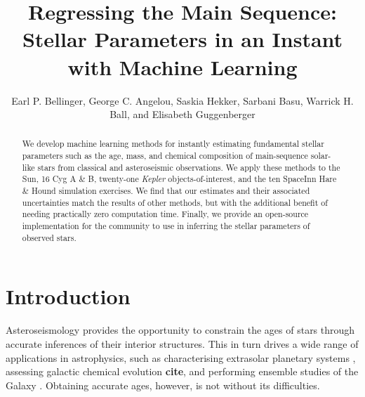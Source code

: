 \documentclass[manuscript]{aastex}
\begin{document}
\title{Regressing the Main Sequence:\\Stellar Parameters in an Instant with Machine Learning}

\author{Earl P. Bellinger, George C. Angelou, Saskia Hekker, Sarbani Basu, Warrick H. Ball, and Elisabeth Guggenberger}


\begin{abstract}
We develop machine learning methods for instantly estimating fundamental stellar parameters such as the age, mass, and chemical composition of main-sequence solar-like stars from classical and asteroseismic observations. We apply these methods to the Sun, 16 Cyg A \& B, twenty-one \emph{Kepler} objects-of-interest, and the ten SpaceInn Hare \& Hound simulation exercises. We find that our estimates and their associated uncertainties match the results of other methods, but with the additional benefit of needing practically zero computation time. Finally, we provide an open-source implementation for the community to use in inferring the stellar parameters of observed stars. 
\end{abstract}




\section{Introduction}

Asteroseismology provides the opportunity to constrain the ages of stars through accurate inferences of their interior structures. This in turn drives a wide range of applications in astrophysics, such as characterising extrasolar planetary systems \citep{2015ApJ...799..170C,2015MNRAS.452.2127S}, assessing galactic chemical evolution \textbf{cite}, and performing ensemble studies of the Galaxy \citep{2011Sci...332..213C, 2013MNRAS.429..423M, 2014ApJS..210....1C}. Obtaining accurate ages, however, is not without its difficulties. 
\end{document}
